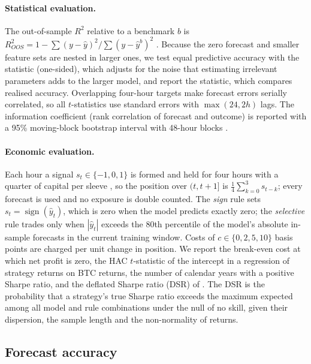 \paragraph{Statistical evaluation.} The out-of-sample $R^2$ relative to a benchmark $b$ is
$R^2_{OOS}=1-\sum(y-\hat y)^2/\sum(y-\hat y^{b})^2$ \citep{campbell2008}. Because the zero forecast and
smaller feature sets are nested in larger ones, we test equal predictive accuracy with the
\citet{clark2007} statistic (one-sided), which adjusts for the noise that estimating irrelevant
parameters adds to the larger model, and report the \citet{diebold1995} statistic, which compares
realised accuracy. Overlapping four-hour targets make forecast errors serially correlated, so all
$t$-statistics use \citet{newey1987} standard errors with $\max(24,2h)$ lags. The information
coefficient (rank correlation of forecast and outcome) is reported with a 95\% moving-block bootstrap
interval with 48-hour blocks \citep{kunsch1989}.

\paragraph{Economic evaluation.} Each hour a signal $s_t\in\{-1,0,1\}$ is formed and held for four
hours with a quarter of capital per sleeve \citep{jegadeesh1993}, so the position over $(t,t+1]$ is
$\frac14\sum_{k=0}^{3}s_{t-k}$; every forecast is used and no exposure is double counted. The
\emph{sign} rule sets $s_t=\operatorname{sign}(\hat y_t)$, which is zero when the model predicts
exactly zero; the \emph{selective} rule trades only when $|\hat y_t|$ exceeds the 80th percentile of
the model's absolute in-sample forecasts in the current training window. Costs of
$c\in\{0,2,5,10\}$ basis points are charged per unit change in position. We report the break-even cost
at which net profit is zero, the HAC $t$-statistic of the intercept in a regression of strategy
returns on BTC returns, the number of calendar years with a positive Sharpe ratio, and the deflated
Sharpe ratio (DSR) of \citet{bailey2014}. The DSR is the probability that a strategy's true Sharpe ratio
exceeds the maximum expected among all \BTCnTrials{} model and rule combinations under the null of no
skill, given their dispersion, the sample length and the non-normality of returns.

\subsection{Forecast accuracy}

